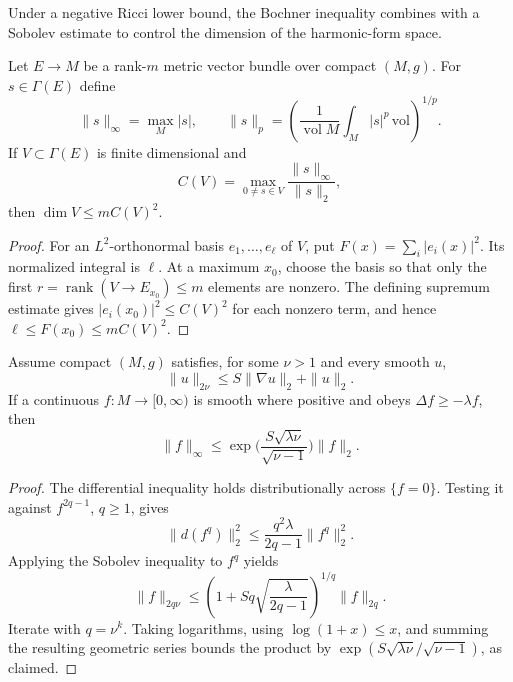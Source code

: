 Under a negative Ricci lower bound, the Bochner inequality combines with a
Sobolev estimate to control the dimension of the harmonic-form space.

\begin{lemma}
  \label{lem:pet-ch9-li-dimension-estimate}

  Let $E\to M$ be a rank-$m$ metric vector bundle over compact $(M,g)$.  For
  $s\in\Gamma(E)$ define
  \[
    \|s\|_\infty=\max_M|s|,
    \qquad
    \|s\|_p=\left(\frac1{\operatorname{vol}M}
      \int_M|s|^p\,\mathrm{vol}\right)^{1/p}.
  \]
  If $V\subset\Gamma(E)$ is finite dimensional and
  \[
    C(V)=\max_{0\ne s\in V}\frac{\|s\|_\infty}{\|s\|_2},
  \]
  then $\dim V\le mC(V)^2$.
\end{lemma}
\begin{proof}
  \sketch
  For an \(L^2\)-orthonormal basis \(e_1,\ldots,e_\ell\) of \(V\), put
  \(F(x)=\sum_i|e_i(x)|^2\).  Its normalized integral is \(\ell\).  At a
  maximum \(x_0\), choose the basis so that only the first
  \(r=\operatorname{rank}(V\to E_{x_0})\le m\) elements are nonzero.  The
  defining supremum estimate gives \(|e_i(x_0)|^2\le C(V)^2\) for each
  nonzero term, and hence
  \(\ell\le F(x_0)\le mC(V)^2\).
\end{proof}

\begin{theorem}
  \label{thm:pet-ch9-moser-iteration}

  Assume compact $(M,g)$ satisfies, for some $\nu>1$ and every smooth $u$,
  \[
    \|u\|_{2\nu}\le S\|\nabla u\|_2+\|u\|_2.
  \]
  If a continuous $f:M\to[0,\infty)$ is smooth where positive and obeys
  $\Delta f\ge-\lambda f$, then
  \[
    \|f\|_\infty\le\exp\Big(\frac{S\sqrt{\lambda\nu}}{\sqrt{\nu-1}}\Big)\|f\|_2.
  \]
\end{theorem}
\begin{proof}
  \sketch
  The differential inequality holds distributionally across \(\{f=0\}\).
  Testing it against \(f^{2q-1}\), \(q\ge1\), gives
  \[
    \|d(f^q)\|_2^2\le\frac{q^2\lambda}{2q-1}\|f^q\|_2^2.
  \]
  Applying the Sobolev inequality to \(f^q\) yields
  \[
    \|f\|_{2q\nu}
    \le\left(1+Sq\sqrt{\frac{\lambda}{2q-1}}\right)^{1/q}\|f\|_{2q}.
  \]
  Iterate with \(q=\nu^k\).  Taking logarithms, using
  \(\log(1+x)\le x\), and summing the resulting geometric series bounds the
  product by
  \(\exp(S\sqrt{\lambda\nu}/\sqrt{\nu-1})\), as claimed.
\end{proof}

